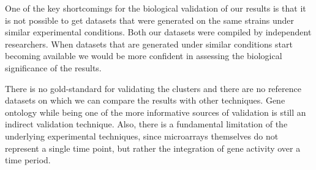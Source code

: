 One of the key shortcomings for the biological validation of our results is that it is not possible to get datasets that were generated on the same strains under similar experimental conditions. Both our datasets were compiled by independent researchers. When datasets that are generated under similar conditions start becoming available we would be more confident in assessing the biological significance of the results.

There is no gold-standard for validating the clusters and there are no reference datasets on which we can compare the results with other techniques. Gene ontology while being one of the more informative sources of validation is still an indirect validation technique. Also, there is a fundamental limitation of the underlying experimental techniques, since microarrays themselves do not represent a single time point, but rather the integration of gene activity over a time period. 